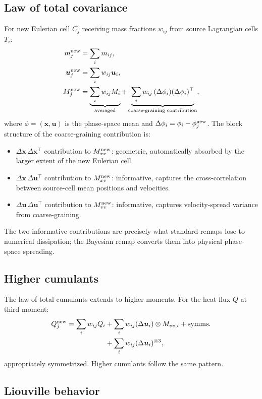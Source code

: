 \documentclass[11pt]{article}
\newcommand{\bx}{\bm{x}}
\newcommand{\bu}{\bm{u}}
\begin{document}
\subsection{Law of total covariance}
\label{sec:remap-LTC}

For new Eulerian cell $C_j$ receiving mass fractions $w_{ij}$ from
source Lagrangian cells $T_i$:
\begin{align}
  m_j^{\rm new} &= \sum_i m_{ij},\\
  \bu_j^{\rm new} &= \sum_i w_{ij}\bu_i,\\
  M_j^{\rm new} &= \underbrace{\sum_i w_{ij} M_i}_{\text{averaged}}
  + \underbrace{\sum_i w_{ij}\,(\Delta\phi_i)(\Delta\phi_i)^\top}_{\text{coarse-graining contribution}},
  \label{eq:LTC}
\end{align}
where $\phi=(\bx,\bu)$ is the phase-space mean and $\Delta\phi_i =
\phi_i - \phi_j^{\rm new}$. The block structure of the coarse-graining
contribution is:
\begin{itemize}
\item $\Delta\bx\,\Delta\bx^\top$ contribution to $M_{xx}^{\rm new}$:
geometric, automatically absorbed by the larger extent of the new
Eulerian cell.
\item $\Delta\bx\,\Delta\bu^\top$ contribution to $M_{xv}^{\rm new}$:
informative, captures the cross-correlation between source-cell mean
positions and velocities.
\item $\Delta\bu\,\Delta\bu^\top$ contribution to $M_{vv}^{\rm new}$:
informative, captures velocity-spread variance from coarse-graining.
\end{itemize}
The two informative contributions are precisely what standard remaps
lose to numerical dissipation; the Bayesian remap converts them into
physical phase-space spreading.

\subsection{Higher cumulants}

The law of total cumulants extends to higher moments. For the heat
flux $Q$ at third moment:
\begin{align}
  Q_j^{\rm new} = \sum_i w_{ij} Q_i &+ \sum_i w_{ij}(\Delta\bu_i)\otimes M_{vv,i}+\text{symms.}\notag\\
  &+ \sum_i w_{ij}(\Delta\bu_i)^{\otimes 3},
\end{align}
appropriately symmetrized. Higher cumulants follow the same pattern.

\subsection{Liouville behavior}
\label{sec:remap-liouville-thm}
\end{document}
